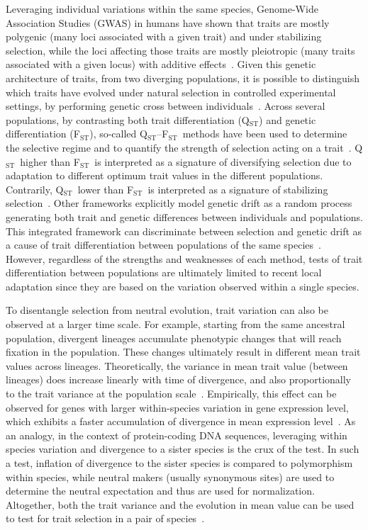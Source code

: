 \documentclass{article}
\newcommand{\Qst}{Q$_\text{ST}$}
\newcommand{\Fst}{F$_\text{ST}$}
\newcommand{\QstFst}{\Qst--\Fst}
\begin{document}
Leveraging individual variations within the same species, Genome-Wide Association Studies (GWAS) in humans have shown that traits are mostly polygenic (many loci associated with a given trait) and under stabilizing selection, while the loci affecting those traits are mostly pleiotropic (many traits associated with a given locus) with additive effects~\citep{simons_population_2018, sella_thinking_2019}.
Given this genetic architecture of traits, from two diverging populations, it is possible to distinguish which traits have evolved under natural selection in controlled experimental settings, by performing genetic cross between individuals~\citep{fraser_detecting_2020}.
Across several populations, by contrasting both trait differentiation (\Qst) and genetic differentiation (\Fst), so-called \QstFst\ methods have been used to determine the selective regime and to quantify the strength of selection acting on a trait~\citep{merila_comparison_2001, leinonen_comparative_2008}.
\Qst\ higher than \Fst\ is interpreted as a signature of diversifying selection due to adaptation to different optimum trait values in the different populations.
Contrarily, \Qst\ lower than \Fst\ is interpreted as a signature of stabilizing selection~\citep{lamy_qst_2012}.
Other frameworks explicitly model genetic drift as a random process generating both trait and genetic differences between individuals and populations.
This integrated framework can discriminate between selection and genetic drift as a cause of trait differentiation between populations of the same species~\citep{ovaskainen_new_2011}.
However, regardless of the strengths and weaknesses of each method\citep{pujol_are_2008, edelaar_comparisons_2011, ovaskainen_new_2011}, tests of trait differentiation between populations are ultimately limited to recent local adaptation since they are based on the variation observed within a single species.

To disentangle selection from neutral evolution, trait variation can also be observed at a larger time scale.
For example, starting from the same ancestral population, divergent lineages accumulate phenotypic changes that will reach fixation in the population.
These changes ultimately result in different mean trait values across lineages.
Theoretically, the variance in mean trait value (between lineages) does increase linearly with time of divergence, and also proportionally to the trait variance at the population scale~\citep{lande_genetic_1980, turelli_heritable_1984}.
Empirically, this effect can be observed for genes with larger within-species variation in gene expression level, which exhibits a faster accumulation of divergence in mean expression level~\citep{khaitovich_neutral_2004}.
As an analogy, in the context of protein-coding DNA sequences, leveraging within species variation and divergence to a sister species is the crux of the \citet{mcdonald_adaptative_1991} test.
In such a test, inflation of divergence to the sister species is compared to polymorphism within species, while neutral makers (usually synonymous sites) are used to determine the neutral expectation and thus are used for normalization.
Altogether, both the trait variance and the evolution in mean value can be used to test for trait selection in a pair of species~\citep{walsh_evolution_2018}.
\end{document}
